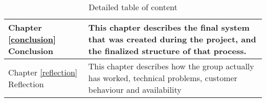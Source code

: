 \begin{table}[h]
\begin{tabular}{|L{0.10\textwidth}|L{0.90\textwidth}|}
\hline
Chapter \ref{conclusion} Conclusion & This chapter describes the final system that was created during the project, and the finalized structure of that process. \\
\hline
Chapter \ref{reflection} Reflection & This chapter describes how the group actually has worked, technical problems, customer behaviour and availability\\
\hline
\end{tabular}
\caption{Detailed table of content}
\label{tab:table-of-content}
\end{table}






